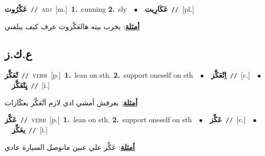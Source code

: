 \documentclass[10pt,a4paper,twoside]{article} %
\begin{document}
\begin{multicols}{2}
{\setlength\topsep{0pt}\textbf{\foreignlanguage{arabic}{عَكْرُوت}}\ {\color{gray}\texttt{//}\color{black}}\ \textsc{adj}\ [m.]\ \textbf{1.}~cunning  \textbf{2.}~sly\ \ $\bullet$\ \ \setlength\topsep{0pt}\textbf{\foreignlanguage{arabic}{عَكَارِيت}}\ {\color{gray}\texttt{//}\color{black}}\ [pl.]\  \begin{flushright}\color{gray}\foreignlanguage{arabic}{\textbf{\underline{\foreignlanguage{arabic}{أمثلة}}}: يخرب بيته هالعَكْروت عرف كيف يبلفني}\end{flushright}\color{black}} \vspace{2mm}

\vspace{-3mm}
\subsection*{\color{blue}\foreignlanguage{arabic}{ع.ك.ز}\color{blue}{}} 

{\setlength\topsep{0pt}\textbf{\foreignlanguage{arabic}{تْعَكَّز}}\ {\color{gray}\texttt{//}\color{black}}\ \textsc{verb}\ [p.]\ \textbf{1.}~lean on sth.  \textbf{2.}~support oneself on sth\ \ $\bullet$\ \ \setlength\topsep{0pt}\textbf{\foreignlanguage{arabic}{اِتْعَكَّز}}\ {\color{gray}\texttt{//}\color{black}}\ [c.]\ \ $\bullet$\ \ \setlength\topsep{0pt}\textbf{\foreignlanguage{arabic}{يِتْعَكَّز}}\ {\color{gray}\texttt{//}\color{black}}\ [i.]\  \begin{flushright}\color{gray}\foreignlanguage{arabic}{\textbf{\underline{\foreignlanguage{arabic}{أمثلة}}}: بعرفش أمشي ادي لازم أتْعَكَّز بعكّازات}\end{flushright}\color{black}} \vspace{2mm}

{\setlength\topsep{0pt}\textbf{\foreignlanguage{arabic}{عَكَّز}}\ {\color{gray}\texttt{//}\color{black}}\ \textsc{verb}\ [p.]\ \textbf{1.}~lean on sth.  \textbf{2.}~support oneself on sth\ \ $\bullet$\ \ \setlength\topsep{0pt}\textbf{\foreignlanguage{arabic}{عَكِّز}}\ {\color{gray}\texttt{//}\color{black}}\ [c.]\ \ $\bullet$\ \ \setlength\topsep{0pt}\textbf{\foreignlanguage{arabic}{يعَكِّز}}\ {\color{gray}\texttt{//}\color{black}}\ [i.]\  \begin{flushright}\color{gray}\foreignlanguage{arabic}{\textbf{\underline{\foreignlanguage{arabic}{أمثلة}}}: عَكِّز علي عبين مانوصل السيارة عادي}\end{flushright}\color{black}} \vspace{2mm}


\end{multicols}
\end{document}
